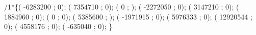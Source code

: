 /1*\{( -6283200 ; 0); 
( 7354710 ; 0); 
( 0 ; ); 
( -2272050 ; 0); 
( 3147210 ; 0); 
( 1884960 ; 0); 
( 0 ; 0); 
( 5385600 ; ); 
( -1971915 ; 0); 
( 5976333 ; 0); 
( 12920544 ; 0); 
( 4558176 ; 0); 
( -635040 ; 0); 
\}